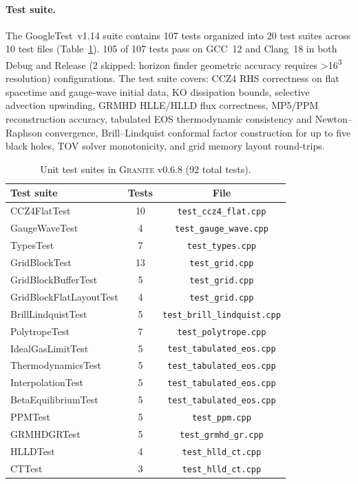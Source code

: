 \documentclass[aps,prd,twocolumn,superscriptaddress,nofootinbib,showpacs,
               longbibliography]{revtex4-2}
\newcommand{\granite}{\textsc{Granite}}
\newcommand{\code}[1]{\texttt{#1}}
\begin{document}
\paragraph{Test suite.}
The GoogleTest~v1.14 suite contains 107 tests organized into 20 test suites
across 10 test files (Table~\ref{tab:tests}).
105 of 107 tests pass on GCC~12 and Clang~18 in both Debug and Release (2 skipped: horizon finder geometric accuracy requires >16\textsuperscript{3} resolution)
configurations.
The test suite covers: CCZ4 RHS correctness on flat spacetime and gauge-wave
initial data, KO dissipation bounds, selective advection upwinding, GRMHD
HLLE/HLLD flux correctness, MP5/PPM reconstruction accuracy, tabulated EOS
thermodynamic consistency and Newton--Raphson convergence, Brill--Lindquist
conformal factor construction for up to five black holes, TOV solver
monotonicity, and grid memory layout round-trips.

\begin{table}[t]
\caption{Unit test suites in \granite{} v0.6.8 (92 total tests).}
\label{tab:tests}
\begin{ruledtabular}
\begin{tabular}{lcc}
  Test suite & Tests & File \\ \hline
  CCZ4FlatTest      & 10 & \code{test\_ccz4\_flat.cpp} \\
  GaugeWaveTest     &  4 & \code{test\_gauge\_wave.cpp} \\
  TypesTest         &  7 & \code{test\_types.cpp} \\
  GridBlockTest     & 13 & \code{test\_grid.cpp} \\
  GridBlockBufferTest & 5 & \code{test\_grid.cpp} \\
  GridBlockFlatLayoutTest & 4 & \code{test\_grid.cpp} \\
  BrillLindquistTest & 5 & \code{test\_brill\_lindquist.cpp} \\
  PolytropeTest     &  7 & \code{test\_polytrope.cpp} \\
  IdealGasLimitTest &  5 & \code{test\_tabulated\_eos.cpp} \\
  ThermodynamicsTest & 5 & \code{test\_tabulated\_eos.cpp} \\
  InterpolationTest &  5 & \code{test\_tabulated\_eos.cpp} \\
  BetaEquilibriumTest & 5 & \code{test\_tabulated\_eos.cpp} \\
  PPMTest           &  5 & \code{test\_ppm.cpp} \\
  GRMHDGRTest       &  5 & \code{test\_grmhd\_gr.cpp} \\
  HLLDTest          &  4 & \code{test\_hlld\_ct.cpp} \\
  CTTest            &  3 & \code{test\_hlld\_ct.cpp} \\
\end{tabular}
\end{ruledtabular}
\end{table}
\end{document}
